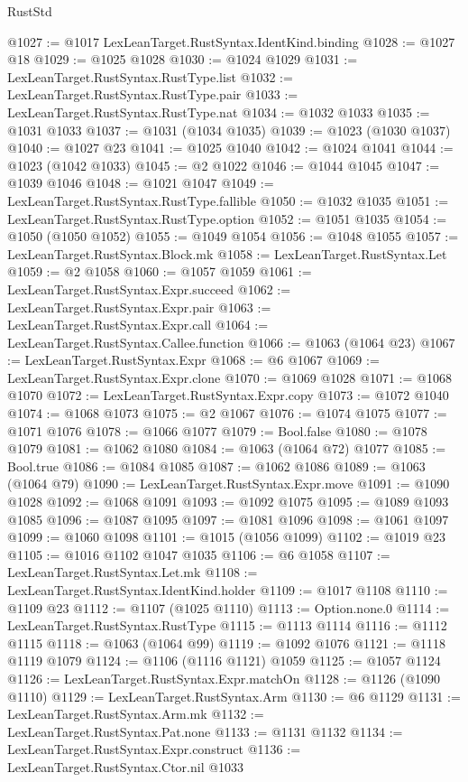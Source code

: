 \begin{lexlean}{RustStd}
\begin{coremodule}
@1027 := @1017 LexLeanTarget.RustSyntax.IdentKind.binding
@1028 := @1027 @18
@1029 := @1025 @1028
@1030 := @1024 @1029
@1031 := LexLeanTarget.RustSyntax.RustType.list
@1032 := LexLeanTarget.RustSyntax.RustType.pair
@1033 := LexLeanTarget.RustSyntax.RustType.nat
@1034 := @1032 @1033
@1035 := @1031 @1033
@1037 := @1031 (@1034 @1035)
@1039 := @1023 (@1030 @1037)
@1040 := @1027 @23
@1041 := @1025 @1040
@1042 := @1024 @1041
@1044 := @1023 (@1042 @1033)
@1045 := @2 @1022
@1046 := @1044 @1045
@1047 := @1039 @1046
@1048 := @1021 @1047
@1049 := LexLeanTarget.RustSyntax.RustType.fallible
@1050 := @1032 @1035
@1051 := LexLeanTarget.RustSyntax.RustType.option
@1052 := @1051 @1035
@1054 := @1050 (@1050 @1052)
@1055 := @1049 @1054
@1056 := @1048 @1055
@1057 := LexLeanTarget.RustSyntax.Block.mk
@1058 := LexLeanTarget.RustSyntax.Let
@1059 := @2 @1058
@1060 := @1057 @1059
@1061 := LexLeanTarget.RustSyntax.Expr.succeed
@1062 := LexLeanTarget.RustSyntax.Expr.pair
@1063 := LexLeanTarget.RustSyntax.Expr.call
@1064 := LexLeanTarget.RustSyntax.Callee.function
@1066 := @1063 (@1064 @23)
@1067 := LexLeanTarget.RustSyntax.Expr
@1068 := @6 @1067
@1069 := LexLeanTarget.RustSyntax.Expr.clone
@1070 := @1069 @1028
@1071 := @1068 @1070
@1072 := LexLeanTarget.RustSyntax.Expr.copy
@1073 := @1072 @1040
@1074 := @1068 @1073
@1075 := @2 @1067
@1076 := @1074 @1075
@1077 := @1071 @1076
@1078 := @1066 @1077
@1079 := Bool.false
@1080 := @1078 @1079
@1081 := @1062 @1080
@1084 := @1063 (@1064 @72) @1077
@1085 := Bool.true
@1086 := @1084 @1085
@1087 := @1062 @1086
@1089 := @1063 (@1064 @79)
@1090 := LexLeanTarget.RustSyntax.Expr.move
@1091 := @1090 @1028
@1092 := @1068 @1091
@1093 := @1092 @1075
@1095 := @1089 @1093 @1085
@1096 := @1087 @1095
@1097 := @1081 @1096
@1098 := @1061 @1097
@1099 := @1060 @1098
@1101 := @1015 (@1056 @1099)
@1102 := @1019 @23
@1105 := @1016 @1102 @1047 @1035
@1106 := @6 @1058
@1107 := LexLeanTarget.RustSyntax.Let.mk
@1108 := LexLeanTarget.RustSyntax.IdentKind.holder
@1109 := @1017 @1108
@1110 := @1109 @23
@1112 := @1107 (@1025 @1110)
@1113 := Option.none.{0}
@1114 := LexLeanTarget.RustSyntax.RustType
@1115 := @1113 @1114
@1116 := @1112 @1115
@1118 := @1063 (@1064 @99)
@1119 := @1092 @1076
@1121 := @1118 @1119 @1079
@1124 := @1106 (@1116 @1121) @1059
@1125 := @1057 @1124
@1126 := LexLeanTarget.RustSyntax.Expr.matchOn
@1128 := @1126 (@1090 @1110)
@1129 := LexLeanTarget.RustSyntax.Arm
@1130 := @6 @1129
@1131 := LexLeanTarget.RustSyntax.Arm.mk
@1132 := LexLeanTarget.RustSyntax.Pat.none
@1133 := @1131 @1132
@1134 := LexLeanTarget.RustSyntax.Expr.construct
@1136 := LexLeanTarget.RustSyntax.Ctor.nil @1033

\end{coremodule}
\end{lexlean}

